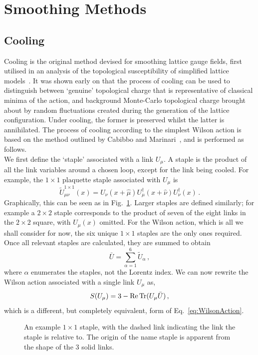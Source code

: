 \section{Smoothing Methods}
\subsection{Cooling}
Cooling is the original method devised for smoothing lattice gauge fields, first utilised in an analysis of the topological susceptibility of simplified lattice models~\cite{Berg:1981nw}. It was shown early on that the process of cooling can be used to distinguish between `genuine' topological charge that is representative of classical minima of the action, and background Monte-Carlo topological charge brought about by random fluctuations created during the generation of the lattice configuration. Under cooling, the former is preserved whilst the latter is annihilated. The process of cooling according to the simplest Wilson action is based on the method outlined by Cabibbo and Marinari~\cite{Cabibbo:1982zn,Creutz:1980zw}, and is performed as follows.\\

We first define the `staple' associated with a link $U_\mu$. A staple is the product of all the link variables around a chosen loop, except for the link being cooled. For example, the $1\times 1$ plaquette staple associated with $U_\mu$ is
%
\begin{equation}
\tilde { U }^{1\times 1} _ { \mu \nu}(x) = U _ { \nu } ( x + \hat { \mu } ) U _ { \mu } ^ { \dagger } ( x + \hat { \nu } ) U _ { \nu } ^ { \dagger } ( x )\, .
\end{equation}
%
Graphically, this can be seen as in Fig.~\ref{fig:Staple}. Larger staples are defined similarly; for example a $2\times 2$ staple corresponds to the product of seven of the eight links in the $2\times 2$ square, with $U_\mu(x)$ omitted. For the Wilson action, which is all we shall consider for now, the six unique $1\times 1$ staples are the only ones required. Once all relevant staples are calculated, they are summed to obtain
%
\begin{equation}
\bar{U} = \sum_{\alpha = 1} ^ 6 \tilde{U}_\alpha\, ,
\label{eq:Staples}
\end{equation}
where $\alpha$ enumerates the staples, not the Lorentz index. We can now rewrite the Wilson action associated with a single link $U_\mu$ as, 
%
\begin{equation}
S(U_\mu) = 3 - \operatorname{Re}\operatorname{Tr} (U_\mu \bar{U})\, ,
\label{eq:WilsonActionCool}
\end{equation}
%
which is a different, but completely equivalent, form of Eq.~\eqref{eq:WilsonAction}.\\ %
\begin{figure}[ht!]
\centering

\caption[An example $1\times 1$ staple.]{\label{fig:Staple} An example $1\times 1$ staple, with the dashed link indicating the link the staple is relative to. The origin of the name staple is apparent from the shape of the 3 solid links.}
\end{figure}
%

